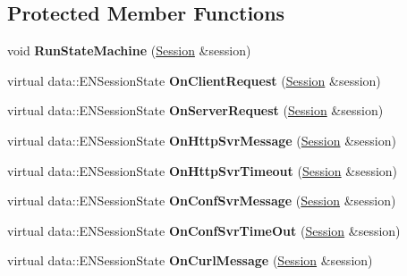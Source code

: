\subsection*{Protected Member Functions}
\begin{DoxyCompactItemize}
\item 
\hypertarget{classBasicHandler_aade373b643d65d0476467a47e0f1cde2}{
void {\bfseries RunStateMachine} (\hyperlink{classSession}{Session} \&session)}
\label{classBasicHandler_aade373b643d65d0476467a47e0f1cde2}

\item 
\hypertarget{classBasicHandler_a4dfb7325bf21027016da492bcb822d0d}{
virtual data::ENSessionState {\bfseries OnClientRequest} (\hyperlink{classSession}{Session} \&session)}
\label{classBasicHandler_a4dfb7325bf21027016da492bcb822d0d}

\item 
\hypertarget{classBasicHandler_a07d77ad7d676157c6f70f84799cdf1bf}{
virtual data::ENSessionState {\bfseries OnServerRequest} (\hyperlink{classSession}{Session} \&session)}
\label{classBasicHandler_a07d77ad7d676157c6f70f84799cdf1bf}

\item 
\hypertarget{classBasicHandler_a3993e5662dbb7119f92797c8e7145c0c}{
virtual data::ENSessionState {\bfseries OnHttpSvrMessage} (\hyperlink{classSession}{Session} \&session)}
\label{classBasicHandler_a3993e5662dbb7119f92797c8e7145c0c}

\item 
\hypertarget{classBasicHandler_ac6864aed392a5b375b68f271a08ca378}{
virtual data::ENSessionState {\bfseries OnHttpSvrTimeout} (\hyperlink{classSession}{Session} \&session)}
\label{classBasicHandler_ac6864aed392a5b375b68f271a08ca378}

\item 
\hypertarget{classBasicHandler_a7e92a6251a91519bd770148bbc180e02}{
virtual data::ENSessionState {\bfseries OnConfSvrMessage} (\hyperlink{classSession}{Session} \&session)}
\label{classBasicHandler_a7e92a6251a91519bd770148bbc180e02}

\item 
\hypertarget{classBasicHandler_a067c5a0f53b85146c18b1f2b5933bb4e}{
virtual data::ENSessionState {\bfseries OnConfSvrTimeOut} (\hyperlink{classSession}{Session} \&session)}
\label{classBasicHandler_a067c5a0f53b85146c18b1f2b5933bb4e}

\item 
\hypertarget{classBasicHandler_a3b9ea6915088f1d16388dbfd6319d693}{
virtual data::ENSessionState {\bfseries OnCurlMessage} (\hyperlink{classSession}{Session} \&session)}
\label{classBasicHandler_a3b9ea6915088f1d16388dbfd6319d693}


\end{DoxyCompactItemize}
